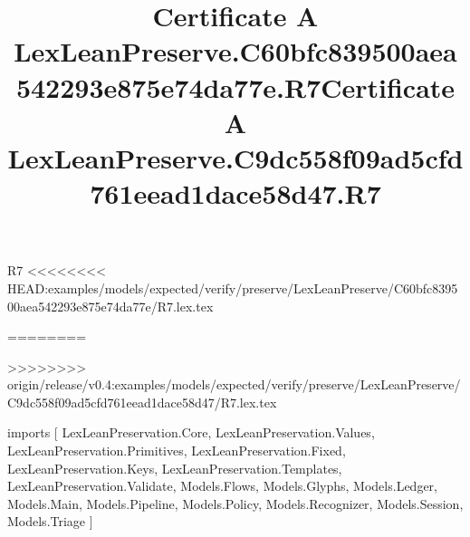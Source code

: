\begin{lexlean}{R7}
<<<<<<<< HEAD:examples/models/expected/verify/preserve/LexLeanPreserve/C60bfc839500aea542293e875e74da77e/R7.lex.tex
\title{Certificate A LexLeanPreserve.C60bfc839500aea542293e875e74da77e.R7}
========
\title{Certificate A LexLeanPreserve.C9dc558f09ad5cfd761eead1dace58d47.R7}
>>>>>>>> origin/release/v0.4:examples/models/expected/verify/preserve/LexLeanPreserve/C9dc558f09ad5cfd761eead1dace58d47/R7.lex.tex
\begin{coremodule}
imports [
  LexLeanPreservation.Core,
  LexLeanPreservation.Values,
  LexLeanPreservation.Primitives,
  LexLeanPreservation.Fixed,
  LexLeanPreservation.Keys,
  LexLeanPreservation.Templates,
  LexLeanPreservation.Validate,
  Models.Flows,
  Models.Glyphs,
  Models.Ledger,
  Models.Main,
  Models.Pipeline,
  Models.Policy,
  Models.Recognizer,
  Models.Session,
  Models.Triage
]


\end{coremodule}
\end{lexlean}
